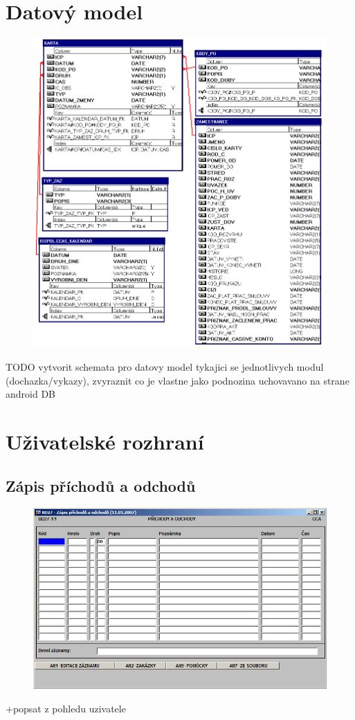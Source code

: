\documentclass{bakalarka}
\begin{document}
\section{Datový model}
\begin{figure}[H]
  \centering
  \includegraphics[scale=0.6]{obr/bd27_dochazka.png}
  \label{}
\end{figure}
TODO vytvorit schemata pro datovy model tykajici se jednotlivych modul (dochazka/vykazy), zvyraznit co je vlastne jako podnozina uchovavano na strane android DB

\section{Uživatelské rozhraní}

\subsection{Zápis příchodů a odchodů}
\begin{figure}[H]
  \centering
  \includegraphics[scale=0.6]{obr/BD27.png}
  \label{}
\end{figure}
+popsat z pohledu uzivatele
\end{document}
